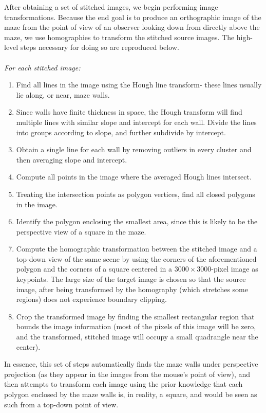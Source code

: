 \documentclass[10pt,twocolumn,letterpaper]{article}
\begin{document}
After obtaining a set of stitched images, we begin performing image transformations.  Because the end goal is to produce
an orthographic image of the maze from the point of view of an observer looking down from directly above the maze, we
use homographies to transform the stitched source images.  The high-level steps necessary for doing so are reproduced
below.
\\
\\
\textit{For each stitched image:}
\begin{enumerate}
	\item Find all lines in the image using the Hough line transform- these lines usually lie along, or near, maze
	walls.
	\item Since walls have finite thickness in space, the Hough transform will find multiple lines with similar slope
	and intercept for each wall.  Divide the lines into groups according to slope, and further subdivide by intercept.
	\item Obtain a single line for each wall by removing outliers in every cluster and then averaging slope and
	intercept.
	\item Compute all points in the image where the averaged Hough lines intersect.
	\item Treating the intersection points as polygon vertices, find all closed polygons in the image.
	\item Identify the polygon enclosing the smallest area, since this is likely to be the perspective view of a square
	in the maze.
	\item Compute the homographic transformation between the stitched image and a top-down view of the same scene by
	using the corners of the aforementioned polygon and the corners of a square centered in a $3000\times 3000$-pixel
	image as keypoints.  The large size of the target image is chosen so that the source image, after being transformed
	by the homography (which stretches some regions) does not experience boundary clipping.
	\item Crop the transformed image by finding the smallest rectangular region that bounds the image information (most
	of the pixels of this image will be zero, and the transformed, stitched image will occupy a small quadrangle near
	the center).
\end{enumerate}

In essence, this set of steps automatically finds the maze walls under perspective projection (as they appear in the
images from the mouse's point of view), and then attempts to transform each image using the prior knowledge that each
polygon enclosed by the maze walls is, in reality, a square, and would be seen as such from a top-down point of view.
\end{document}
